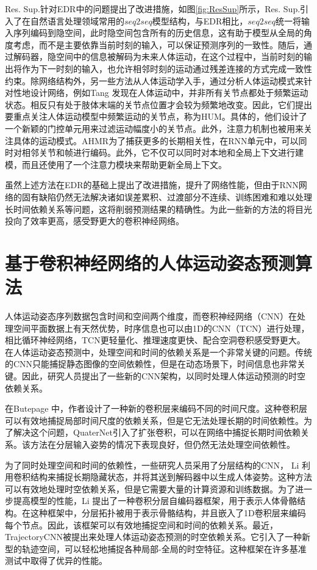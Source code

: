 Res. Sup.\parencite{martinez2017human}针对EDR中的问题提出了改进措施，如图\ref{fig:ResSup}所示，Res. Sup.引入了在自然语言处理领域常用的$seq2seq$模型结构，与EDR相比，$seq2seq$统一将输入序列编码到隐空间，此时隐空间包含所有的历史信息，这有助于模型从全局的角度考虑，而不是主要依靠当前时刻的输入，可以保证预测序列的一致性。随后，通过解码器，隐空间中的信息被解码为未来人体运动，在这个过程中，当前时刻的输出将作为下一时刻的输入，也允许相邻时刻的运动通过残差连接的方式完成一致性约束。除网络结构外，另一些方法从人体运动学入手，通过分析人体运动模式来针对性地设计网络，例如Tang \etal \parencite{tang2018long}发现在人体运动中，并非所有关节点都处于频繁运动状态。相反只有处于肢体末端的关节点位置才会较为频繁地改变。因此，它们提出要重点关注人体运动模型中频繁运动的关节点，称为HUM。具体的，他们设计了一个新颖的门控单元用来过滤运动幅度小的关节点。此外，注意力机制也被用来关注具体的运动模式。AHMR\parencite{liu2022investigating}为了捕获更多的长期相关性，在RNN单元中，可以同时对相邻关节和帧进行编码。此外，它不仅可以同时对本地和全局上下文进行建模，而且还使用了一个注意力模块来帮助更新全局上下文。

虽然上述方法在EDR的基础上提出了改进措施，提升了网络性能，但由于RNN网络的固有缺陷仍然无法解决诸如误差累积、过渡部分不连续、训练困难和难以处理长时间依赖关系等问题，这将削弱预测结果的精确性。为此一些新的方法的将目光投向了效率更高，感受野更大的卷积神经网络。

\section{基于卷积神经网络的人体运动姿态预测算法}
人体运动姿态序列数据包含时间和空间两个维度，而卷积神经网络（CNN）在处理空间平面数据上有天然优势，时序信息也可以由1D的CNN（TCN\parencite{oord2016wavenet}）进行处理，相比循环神经网络，TCN更轻量化、推理速度更快、配合空洞卷积\parencite{yu2017dilated}感受野更大。在人体运动姿态预测中，处理空间和时间的依赖关系是一个非常关键的问题。传统的CNN只能捕捉静态图像的空间依赖性，但是在动态场景下，时间信息也非常关键。因此，研究人员提出了一些新的CNN架构，以同时处理人体运动预测的时空依赖关系。

在Butepage \etal \parencite{butepage2017deep}中，作者设计了一种新的卷积层来编码不同的时间尺度。这种卷积层可以有效地捕捉局部时间尺度的依赖关系，但是它无法处理长期的时间依赖性。为了解决这个问题，QuaterNet\parencite{pavllo2018quaternet}引入了扩张卷积，可以在网络中捕捉长期时间依赖关系。该方法在分层输入姿势的情况下表现良好，但仍然无法处理空间依赖性。

为了同时处理空间和时间的依赖性，一些研究人员采用了分层结构的CNN， Li \etal \parencite{li2018convolutional}利用卷积结构来捕捉长期隐藏状态，并将其送到解码器中以生成人体姿势。这种方法可以有效地处理时空依赖关系，但是它需要大量的计算资源和训练数据。为了进一步提高模型的性能，Li \etal \parencite{li2019efficient}提出了一种卷积分层自编码器框架，用于表示人体骨骼结构。在这种框架中，分层拓扑被用于表示骨骼结构，并且嵌入了1D卷积层来编码每个节点。因此，该框架可以有效地捕捉空间和时间的依赖关系。最近，TrajectoryCNN\parencite{liu2020trajectorycnn}被提出来处理人体运动姿态预测的时空依赖关系。它引入了一种新型的轨迹空间，可以轻松地捕捉各种局部-全局的时空特征。这种框架在许多基准测试中取得了优异的性能。

